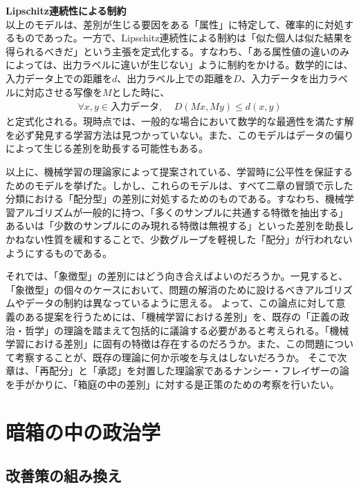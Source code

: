 \documentclass[b5j,twoside,twocolumn]{utarticle}
\begin{document}
\textbf{Lipschitz連続性による制約}\\
以上のモデルは、差別が生じる要因をある「属性」に特定して、確率的に対処するものであった。一方で、Lipschitz連続性による制約は「似た個人は似た結果を得られるべきだ」という主張を定式化する。すなわち、「ある属性値の違いのみによっては、出力ラベルに違いが生じない」ように制約をかける。数学的には、入力データ上での距離を$d$、出力ラベル上での距離を$D$、入力データを出力ラベルに対応させる写像を$M$とした時に、\\
\begin{eqnarray}
\forall x, y \in 入力データ,~~~~~D(Mx, My) \leq d(x, y)
\end{eqnarray}
と定式化される。現時点では、一般的な場合において数学的な最適性を満たす解を必ず発見する学習方法は見つかっていない。また、このモデルはデータの偏りによって生じる差別を助長する可能性もある。

以上に、機械学習の理論家によって提案されている、学習時に公平性を保証するためのモデルを挙げた。しかし、これらのモデルは、すべて二章の冒頭で示した分類における「配分型」の差別に対処するためのものである。すなわち、機械学習アルゴリズムが一般的に持つ、「多くのサンプルに共通する特徴を抽出する」あるいは「少数のサンプルにのみ現れる特徴は無視する」といった差別を助長しかねない性質を緩和することで、少数グループを軽視した「配分」が行われないようにするものである。


それでは、「象徴型」の差別にはどう向き合えばよいのだろうか。一見すると、「象徴型」の個々のケースにおいて、問題の解消のために設けるべきアルゴリズムやデータの制約は異なっているように思える。
よって、この論点に対して意義のある提案を行うためには、「機械学習における差別」を、既存の「正義の政治・哲学」の理論を踏まえて包括的に議論する必要があると考えられる。「機械学習における差別」に固有の特徴は存在するのだろうか。また、この問題について考察することが、既存の理論に何か示唆を与えはしないだろうか。
そこで次章は、「再配分」と「承認」を対置した理論家であるナンシー・フレイザーの論を手がかりに、「箱庭の中の差別」に対する是正策のための考察を行いたい。

\section{暗箱の中の政治学}
\subsection{改善策の組み換え}
\end{document}
